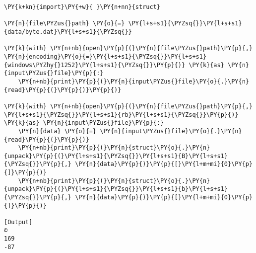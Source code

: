 \begin{Verbatim}[label=\makebox{\href{https://github.com/unipi-physics-labs/statnotes/tree/main/snippy/byte.py}{https://github.com/.../byte.py}},commandchars=\\\{\}]
\PY{k+kn}{import}\PY{+w}{ }\PY{n+nn}{struct}

\PY{n}{file\PYZus{}path} \PY{o}{=} \PY{l+s+s1}{\PYZsq{}}\PY{l+s+s1}{data/byte.dat}\PY{l+s+s1}{\PYZsq{}}

\PY{k}{with} \PY{n+nb}{open}\PY{p}{(}\PY{n}{file\PYZus{}path}\PY{p}{,} \PY{n}{encoding}\PY{o}{=}\PY{l+s+s1}{\PYZsq{}}\PY{l+s+s1}{windows\PYZhy{}1252}\PY{l+s+s1}{\PYZsq{}}\PY{p}{)} \PY{k}{as} \PY{n}{input\PYZus{}file}\PY{p}{:}
    \PY{n+nb}{print}\PY{p}{(}\PY{n}{input\PYZus{}file}\PY{o}{.}\PY{n}{read}\PY{p}{(}\PY{p}{)}\PY{p}{)}

\PY{k}{with} \PY{n+nb}{open}\PY{p}{(}\PY{n}{file\PYZus{}path}\PY{p}{,} \PY{l+s+s1}{\PYZsq{}}\PY{l+s+s1}{rb}\PY{l+s+s1}{\PYZsq{}}\PY{p}{)} \PY{k}{as} \PY{n}{input\PYZus{}file}\PY{p}{:}
    \PY{n}{data} \PY{o}{=} \PY{n}{input\PYZus{}file}\PY{o}{.}\PY{n}{read}\PY{p}{(}\PY{p}{)}
    \PY{n+nb}{print}\PY{p}{(}\PY{n}{struct}\PY{o}{.}\PY{n}{unpack}\PY{p}{(}\PY{l+s+s1}{\PYZsq{}}\PY{l+s+s1}{B}\PY{l+s+s1}{\PYZsq{}}\PY{p}{,} \PY{n}{data}\PY{p}{)}\PY{p}{[}\PY{l+m+mi}{0}\PY{p}{]}\PY{p}{)}
    \PY{n+nb}{print}\PY{p}{(}\PY{n}{struct}\PY{o}{.}\PY{n}{unpack}\PY{p}{(}\PY{l+s+s1}{\PYZsq{}}\PY{l+s+s1}{b}\PY{l+s+s1}{\PYZsq{}}\PY{p}{,} \PY{n}{data}\PY{p}{)}\PY{p}{[}\PY{l+m+mi}{0}\PY{p}{]}\PY{p}{)}

[Output]
©
169
-87
\end{Verbatim}
